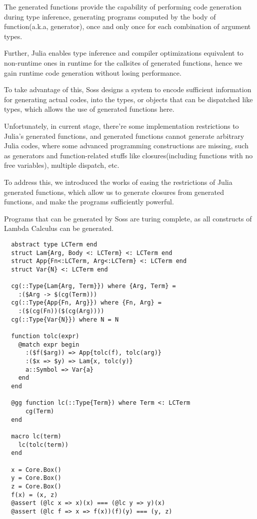 \documentclass[anonymous=false, %
               format=acmsmall, %
               review=true, %
               screen=true, %
               nonacm=true]{acmart}
\begin{document}
The generated functions provide the capability of performing code generation during type inference, generating programs computed by the body of function(a.k.a, generator), once and only once for each combination of argument types.

Further, Julia enables type inference and compiler optimizations equivalent to non-runtime ones in runtime for the callsites of generated functions, hence we gain runtime code generation without losing performance.

To take advantage of this, Soss designs a system to encode sufficient information for generating actual codes, into the types, or objects that can be dispatched like types, which allows the use of generated functions here.

Unfortunately, in current stage, there're some implementation restrictions to Julia's generated functions, and generated functions cannot generate arbitrary Julia codes,
where some advanced programming constructions are missing, such as generators and function-related stuffs like closures(including functions with no free variables), multiple dispatch, etc.

To address this, we introduced the works of easing the restrictions of Julia generated functions,
which allow us to generate closures from generated functions, and make the programs sufficiently powerful.

Programs that can be generated by Soss are turing complete, as all constructs of Lambda Calculus can be generated.

\begin{verbatim}
  abstract type LCTerm end
  struct Lam{Arg, Body <: LCTerm} <: LCTerm end
  struct App{Fn<:LCTerm, Arg<:LCTerm} <: LCTerm end
  struct Var{N} <: LCTerm end
  
  cg(::Type{Lam{Arg, Term}}) where {Arg, Term} = 
    :($Arg -> $(cg(Term)))
  cg(::Type{App{Fn, Arg}}) where {Fn, Arg} = 
    :($(cg(Fn))($(cg(Arg))))
  cg(::Type{Var{N}}) where N = N

  function tolc(expr)
    @match expr begin
      :($f($arg)) => App{tolc(f), tolc(arg)}
      :($x => $y) => Lam{x, tolc(y)}
      a::Symbol => Var{a}
    end
  end
  
  @gg function lc(::Type{Term}) where Term <: LCTerm
      cg(Term)
  end
  
  macro lc(term)
    lc(tolc(term))
  end
  
  x = Core.Box()
  y = Core.Box()
  z = Core.Box()
  f(x) = (x, z)
  @assert (@lc x => x)(x) === (@lc y => y)(x)
  @assert (@lc f => x => f(x))(f)(y) === (y, z)
  \end{verbatim} 
\end{document}
